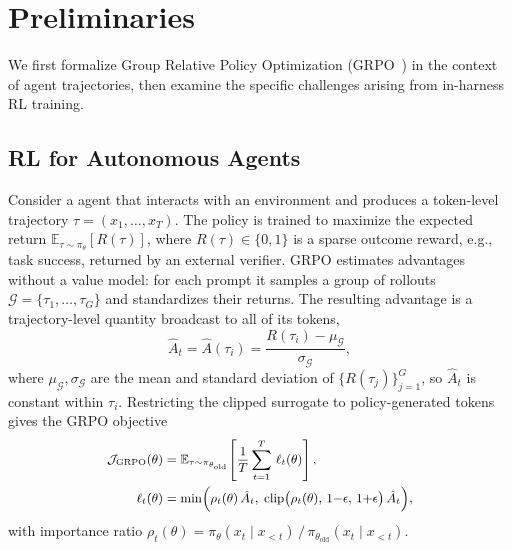\documentclass[letterpaper]{article} %
\begin{document}
\section{Preliminaries}
\label{sec:prelim}
We first formalize Group Relative Policy Optimization (GRPO~\citep{guo2025deepseek}) in the context of agent trajectories, then examine the specific challenges arising from in-harness RL training.

\subsection{RL for Autonomous Agents}
\label{subsec:rl}
Consider a agent that interacts with an environment and produces a token-level trajectory $\tau = (x_1, \dots, x_T)$. 
The policy is trained to maximize the expected return $\mathbb{E}_{\tau \sim \pi_\theta}[R(\tau)]$, where $R(\tau) \in \{0,1\}$ is a sparse outcome reward, e.g., task success, returned by an external verifier.
GRPO estimates advantages without a value model: for each prompt it samples a group of rollouts $\mathcal{G} = \{\tau_1, \dots, \tau_G\}$ and standardizes their returns. 
The resulting advantage is a trajectory-level quantity broadcast to all of its tokens,
\begin{equation}
\label{eq:adv}
    \hat{A}_t = \hat{A}(\tau_i) = \frac{R(\tau_i) - \mu_{\mathcal{G}}}{\sigma_{\mathcal{G}}},
\end{equation}
where $\mu_{\mathcal{G}}, \sigma_{\mathcal{G}}$ are the mean and standard deviation of $\{R(\tau_j)\}_{j=1}^{G}$, so $\hat{A}_t$ is constant within $\tau_i$. Restricting the clipped surrogate to policy-generated tokens gives the GRPO objective
\begin{equation}
\label{eq:grpo}
\small
\begin{aligned}
    \mathcal{J}_{\text{GRPO}}(\theta) &= \mathbb{E}_{\tau \sim \pi_{\theta_{\text{old}}}} \!\left[ \frac{1}{{T} } \sum_{t=1}^{T}  \, \ell_t(\theta) \right], \\
    \ell_t(\theta) &= \min\!\Big( \rho_t(\theta)\, \hat{A}_t,\; \operatorname{clip}\!\big(\rho_t(\theta),\, 1{-}\epsilon,\, 1{+}\epsilon\big)\, \hat{A}_t \Big),
\end{aligned}
\end{equation}
with importance ratio $\rho_t(\theta) = \pi_\theta(x_t \mid x_{<t}) \,/\, \pi_{\theta_{\text{old}}}(x_t \mid x_{<t})$. 
\end{document}
